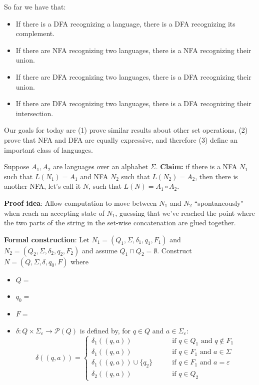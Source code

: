 \documentclass[12pt, oneside]{article}
\begin{document}
So far we have that: 
\begin{itemize}
\item If there is a DFA recognizing a language, there is a DFA recognizing its complement.
\item If there are NFA recognizing two languages, there is a NFA recognizing their union.
\item If there are DFA recognizing two languages, there is a DFA recognizing their union.
\item If there are DFA recognizing two languages, there is a DFA recognizing their intersection.
\end{itemize}

Our goals for today are (1) prove similar results about other set operations, (2) prove that 
NFA and DFA are equally expressive, and therefore (3) define an important class of languages.

\vfill

Suppose $A_1, A_2$ are languages over an alphabet $\Sigma$.
{\bf Claim:} if there is a NFA $N_1$ such that $L(N_1) = A_1$ and 
NFA $N_2$ such that $L(N_2) = A_2$, then there is another NFA, let's call it $N$, such that 
$L(N) = A_1 \circ A_2$.

{\bf Proof idea}: Allow computation to move between $N_1$ and $N_2$ ``spontaneously" when reach an accepting state of 
$N_1$, guessing that we've reached the point where the two parts of the string in the set-wise concatenation 
are glued together.


{\bf Formal construction}: Let 
$N_1 = (Q_1, \Sigma, \delta_1, q_1, F_1)$ and $N_2 = (Q_2, \Sigma, \delta_2,q_2, F_2)$
and assume $Q_1 \cap Q_2 = \emptyset$.
Construct $N = (Q, \Sigma, \delta, q_0, F)$ where
\begin{itemize}
    \item $Q = $
    \item $q_0 = $
    \item $F = $
    \item $\delta: Q \times \Sigma_\varepsilon \to \mathcal{P}(Q)$ is defined by, for $q \in Q$ and $a \in \Sigma_{\varepsilon}$:
        \[
            \delta((q,a))=\begin{cases}  
                \delta_1 ((q,a)) &\qquad\text{if } q\in Q_1 \textrm{ and } q \notin F_1\\ 
                \delta_1 ((q,a)) &\qquad\text{if } q\in F_1 \textrm{ and } a \in \Sigma\\ 
                \delta_1 ((q,a)) \cup \{q_2\} &\qquad\text{if } q\in F_1 \textrm{ and } a = \varepsilon\\ 
                \delta_2 ((q,a)) &\qquad\text{if } q\in Q_2
            \end{cases}
        \]
\end{itemize}
\end{document}
